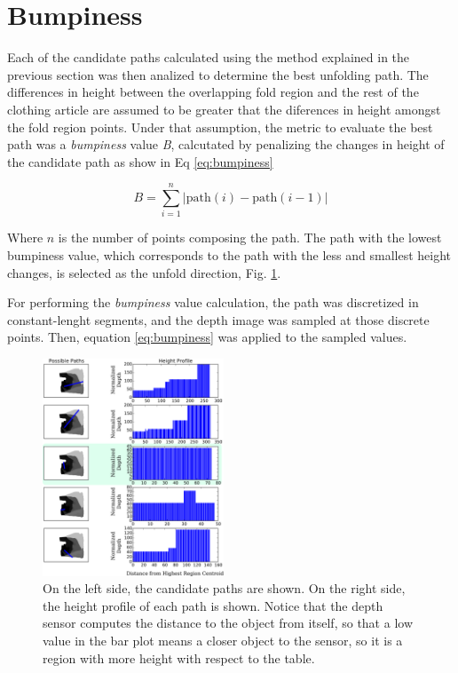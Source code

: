 \section{Bumpiness}
\label{bumpiness}

Each of the candidate paths calculated using the method explained in the previous section was then analized to determine the best unfolding path. The differences in height between the overlapping fold region and the rest of the clothing article are assumed to be greater that the diferences in height amongst the fold region points. Under that assumption, the metric to evaluate the best path was a \textit{bumpiness} value \textit{B}, calcutated by penalizing the changes in height of the candidate path as show in Eq \ref{eq:bumpiness}

\begin{equation}\label{eq:bumpiness}
B = \sum_{i=1}^{n} | \textrm{path}(i)- \textrm{path}(i-1) | 
\end{equation}

Where $n$ is the number of points composing the path. The path with the lowest bumpiness value, which corresponds to the path with the less and smallest height changes, is selected as the unfold direction, Fig. \ref{fig:paths_with_bumpiness}.

For performing the \textit{bumpiness} value calculation, the path was discretized  in constant-lenght segments, and the depth image was sampled at those discrete points. Then, equation \ref{eq:bumpiness} was applied to the sampled values.

\begin{figure}[thpb]
    \centering
    \includegraphics[width=0.48\textwidth]{figures/candidate_paths.pdf}
    \caption{On the left side, the candidate paths are shown. On the right side, the height profile of each path is shown. Notice that the depth sensor computes the distance to the object from itself, so that a low value in the bar plot means a closer object to the sensor, so it is a region with more height with respect to the table.}
    \label{fig:paths_with_bumpiness}
\end{figure}


